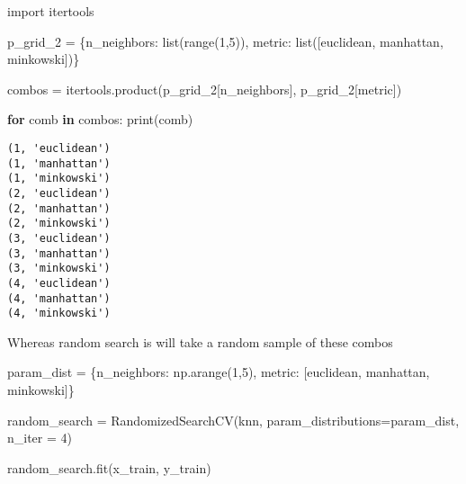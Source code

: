 \documentclass[
  letterpaper,
  DIV=11,
  numbers=noendperiod]{scrreprt}
\newenvironment{Shaded}{\begin{snugshade}}{\end{snugshade}}
\newcommand{\BuiltInTok}[1]{\textcolor[rgb]{0.00,0.23,0.31}{#1}}
\newcommand{\ControlFlowTok}[1]{\textcolor[rgb]{0.00,0.23,0.31}{\textbf{#1}}}
\newcommand{\DecValTok}[1]{\textcolor[rgb]{0.68,0.00,0.00}{#1}}
\newcommand{\ImportTok}[1]{\textcolor[rgb]{0.00,0.46,0.62}{#1}}
\newcommand{\KeywordTok}[1]{\textcolor[rgb]{0.00,0.23,0.31}{\textbf{#1}}}
\newcommand{\NormalTok}[1]{\textcolor[rgb]{0.00,0.23,0.31}{#1}}
\newcommand{\OperatorTok}[1]{\textcolor[rgb]{0.37,0.37,0.37}{#1}}
\newcommand{\StringTok}[1]{\textcolor[rgb]{0.13,0.47,0.30}{#1}}
\begin{document}
\begin{Shaded}
\begin{Highlighting}[]
\ImportTok{import}\NormalTok{ itertools}

\NormalTok{p\_grid\_2 }\OperatorTok{=}\NormalTok{ \{}\StringTok{\textquotesingle{}n\_neighbors\textquotesingle{}}\NormalTok{: }\BuiltInTok{list}\NormalTok{(}\BuiltInTok{range}\NormalTok{(}\DecValTok{1}\NormalTok{,}\DecValTok{5}\NormalTok{)), }\StringTok{\textquotesingle{}metric\textquotesingle{}}\NormalTok{: }\BuiltInTok{list}\NormalTok{([}\StringTok{\textquotesingle{}euclidean\textquotesingle{}}\NormalTok{, }\StringTok{\textquotesingle{}manhattan\textquotesingle{}}\NormalTok{, }\StringTok{\textquotesingle{}minkowski\textquotesingle{}}\NormalTok{])\}}

\NormalTok{combos }\OperatorTok{=}\NormalTok{ itertools.product(p\_grid\_2[}\StringTok{\textquotesingle{}n\_neighbors\textquotesingle{}}\NormalTok{], p\_grid\_2[}\StringTok{\textquotesingle{}metric\textquotesingle{}}\NormalTok{])}

\ControlFlowTok{for}\NormalTok{ comb }\KeywordTok{in}\NormalTok{ combos:}
    \BuiltInTok{print}\NormalTok{(comb)}
\end{Highlighting}
\end{Shaded}

\begin{verbatim}
(1, 'euclidean')
(1, 'manhattan')
(1, 'minkowski')
(2, 'euclidean')
(2, 'manhattan')
(2, 'minkowski')
(3, 'euclidean')
(3, 'manhattan')
(3, 'minkowski')
(4, 'euclidean')
(4, 'manhattan')
(4, 'minkowski')
\end{verbatim}

Whereas random search is will take a random sample of these combos

\begin{Shaded}
\begin{Highlighting}[]
\NormalTok{param\_dist }\OperatorTok{=}\NormalTok{ \{}\StringTok{\textquotesingle{}n\_neighbors\textquotesingle{}}\NormalTok{: np.arange(}\DecValTok{1}\NormalTok{,}\DecValTok{5}\NormalTok{), }\StringTok{\textquotesingle{}metric\textquotesingle{}}\NormalTok{: [}\StringTok{\textquotesingle{}euclidean\textquotesingle{}}\NormalTok{, }\StringTok{\textquotesingle{}manhattan\textquotesingle{}}\NormalTok{, }\StringTok{\textquotesingle{}minkowski\textquotesingle{}}\NormalTok{]\}}

\NormalTok{random\_search }\OperatorTok{=}\NormalTok{ RandomizedSearchCV(knn, param\_distributions}\OperatorTok{=}\NormalTok{param\_dist, n\_iter }\OperatorTok{=} \DecValTok{4}\NormalTok{)}

\NormalTok{random\_search.fit(x\_train, y\_train)}
\end{Highlighting}
\end{Shaded}
\end{document}
